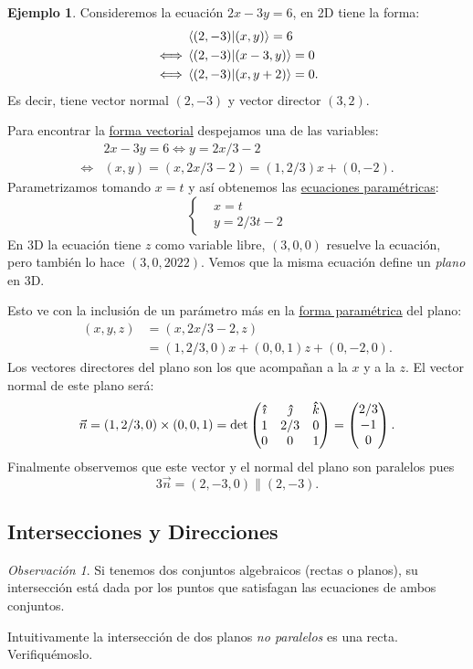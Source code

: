 \documentclass[12pt]{article}
\theoremstyle{plain}
\theoremstyle{definition}
\newtheorem{Ex}[Th]{Ejemplo}           %
\theoremstyle{remark}
\newtheorem*{Rmk}{Observación}      %
\newcommand{\thickhat}[1]{\mathbf{\hat{\text{$#1$}}}}
\newcommand{\ii}{\vu{\imath}}
\newcommand{\jj}{\vu{\jmath}}
\newcommand{\kk}{\thickhat{k}}
\newcommand{\x}{\times}             %
\renewcommand{\:}{\colon}           %
\newcommand{\un}[1]{\underline{#1}}
\renewcommand{\.}{\Cdot}                %
\newcommand{\threebyone}[3]{\begin{pmatrix} %
  #1 \\ #2 \\ #3 \end{pmatrix}}
\newcommand{\threebythree}[9]{\begin{pmatrix} %
  #1 & #2 & #3 \\ #4 & #5 & #6 \\ #7 & #8 & #9 \end{pmatrix}}
\begin{document}
\begin{multicols}{2}
\begin{Ex}
Consideremos la ecuación $2x-3y=6$, en 2D tiene la forma:
\begin{align*}
  &\braket{(2,-3)}{(x,y)}=6\\
  \iff&\braket{(2,-3)}{(x-3,y)}=0\\
  \iff&\braket{(2,-3)}{(x,y+2)}=0.
\end{align*}
Es decir, tiene vector normal $(2,-3)$ y vector director $(3,2)$.\par 
Para encontrar la \un{forma vectorial} despejamos una de las variables:
\begin{align*}
  &2x-3y=6\iff y=2x/3-2\\
  \iff&(x,y)=\left(x,2x/3-2\right)=\left(1,2/3\right)x+(0,-2).
\end{align*}
Parametrizamos tomando $x=t$ y así obtenemos las \un{ecuaciones paramétricas}:
$$
\left\lbrace
\begin{aligned}
  &x=t\\
  &y=2/3t-2
\end{aligned}
\right.
$$
En 3D la ecuación tiene $z$ como variable libre, $(3,0,0)$ resuelve la ecuación, pero también lo hace $(3,0,2022)$. Vemos que la misma ecuación define un \emph{plano} en 3D.\par 
Esto ve con la inclusión de un parámetro más en la \un{forma paramétrica} del plano:
\begin{align*}
  (x,y,z)&=\left(x,2x/3-2,z\right)\\
  &=\left(1,2/3,0\right)x+(0,0,1)z+(0,-2,0).
\end{align*}
Los vectores directores del plano son los que acompañan a la $x$ y a la $z$. El vector normal de este plano será:
$$\vec{n}=\left(1,2/3,0\right)\x(0,0,1)=\det\threebythree{\ii}{\jj}{\kk}{1}{2/3}{0}{0}{0}{1}=\threebyone{2/3}{-1}{0}.$$
Finalmente observemos que este vector y el normal del plano son paralelos pues 
$$3\vec{n}=(2,-3,0)\parallel(2,-3).$$
\end{Ex}
\subsection*{Intersecciones y Direcciones}

\begin{Rmk}
  Si tenemos dos conjuntos algebraicos (rectas o planos), su intersección está dada por los puntos que satisfagan las ecuaciones de ambos conjuntos.
\end{Rmk}

Intuitivamente la intersección de dos planos \emph{no paralelos} es una recta. Verifiquémoslo.


\end{multicols}
\end{document}
